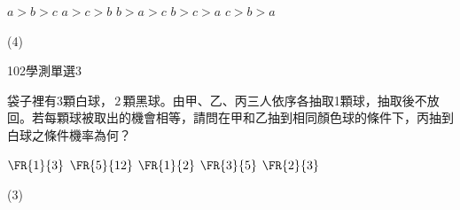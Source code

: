 \begin{QUESTIONS}
\begin{QUESTION}
\begin{QBODY}
			\begin{QOPS}
				\QOP $a>b>c$
				\QOP $a>c>b$
				\QOP $b>a>c$
				\QOP $b>c>a$
				\QOP $c>b>a$
			\end{QOPS}
        \end{QBODY}
        \begin{QFROMS}
        \end{QFROMS}
        \begin{QTAGS}\end{QTAGS}
        \begin{QANS}
            (4)
        \end{QANS}
        \begin{QSOLLIST}
        \end{QSOLLIST}
        \begin{QEMPTYSPACE}
        \end{QEMPTYSPACE}
    \end{QUESTION}
    \begin{QUESTION}
        \begin{ExamInfo}{102}{學測}{單選}{3}
        \end{ExamInfo}
        \begin{ExamAnsRateInfo}{35}{67}{26}{12}
        \end{ExamAnsRateInfo}
        \begin{QBODY}
            袋子裡有3顆白球，$\,2\,$顆黑球。由甲、乙、丙三人依序各抽取1顆球，抽取後不放回。若每顆球被取出的機會相等，請問在甲和乙抽到相同顏色球的條件下，丙抽到白球之條件機率為何？
			\begin{QOPS}
				\QOP $\FR{1}{3}$	
				\QOP $\FR{5}{12}$	
				\QOP $\FR{1}{2}$
				\QOP $\FR{3}{5}$	
				\QOP $\FR{2}{3}$
			\end{QOPS}
        \end{QBODY}
        \begin{QFROMS}
        \end{QFROMS}
        \begin{QTAGS}\end{QTAGS}
        \begin{QANS}
            (3)
        \end{QANS}
        \begin{QSOLLIST}
        \end{QSOLLIST}
        \begin{QEMPTYSPACE}
        \end{QEMPTYSPACE}
    \end{QUESTION}

\end{QUESTIONS}
